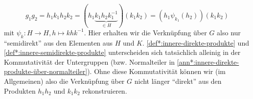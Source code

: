 \documentclass[a4paper, ngerman]{article}
\numberwithin{equation}{chapter}
\theoremstyle{plain}
\theoremstyle{definition}
\begin{document}
\begin{equation}\label{eq:innere-produkt-rekonstruktion}
    g_1g_2 = h_1k_1h_2k_2 = (h_1\underbrace{k_1h_2k_1^{-1}}_{\in H})(k_1k_2) = (h_1 \psi_{k_1}(h_2))(k_1k_2)
\end{equation}
mit \(\psi_k: H \to H, h\mapsto khk^{-1}\). 
Hier erhalten wir die Verknüpfung über \(G\) also nur "`semidirekt"' aus den Elementen aus \(H\) und \(K\). \cref{def*:innere-direkte-produkte} und \cref{def*:innere-semidirekte-produkte} unterscheiden sich tatsächlich alleinig in der Kommutativität der Untergruppen (bzw. Normalteiler in \cref{ann*:innere-direkte-produkte-über-normalteiler}). 
Ohne diese Kommutativität können wir (im Allgemeinen) also die Verknüpfung über \(G\) nicht länger "`direkt"' aus den Produkten \(h_1h_2\) und \(k_1k_2\) rekonstruieren.
 
\end{document}

